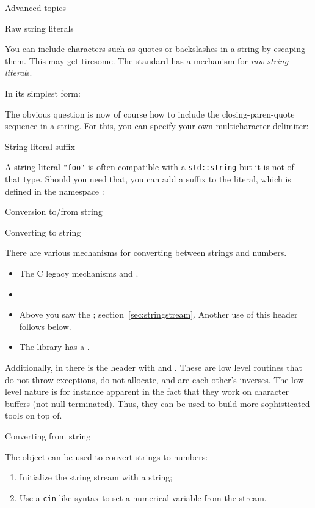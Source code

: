  {Advanced topics}

 {Raw string literals}

You can include characters such as quotes or backslashes in a string
by escaping them. This may get tiresome.
The  standard has a mechanism for 
\emph{raw string literal}s.

In its simplest form:

The obvious question is now of course how to include the
closing-paren-quote sequence in a string.
For this, you can specify your own multicharacter delimiter:

 {String literal suffix}

A string literal \lstinline+"foo"+ is often compatible with a
\lstinline+std::string+ but it is not of that type.
Should you need that, you can add a suffix to the literal,
which is defined in the namespace :
%

 {Conversion to/from string}

 {Converting to string}

There are various mechanisms for converting between strings and numbers.
\begin{itemize}
\item The C legacy mechanisms  and .
\item  {}
\item Above you saw the ; section~\ref{sec:stringstream}.
  Another use of this header follows below.
\item The  library has a .
\end{itemize}

Additionally, in  there is the
 header with  and
. These are low level routines that do not
throw exceptions, do not allocate, and are each other's inverses. The
low level nature is for instance apparent in the fact that they work
on character buffers (not null-terminated). Thus, they can be used to
build more sophisticated tools on top of.

 {Converting from string}

The  object can be used to convert strings to numbers:
\begin{enumerate}
\item Initialize the string stream with a string;
\item Use a \lstinline{cin}-like syntax to set a numerical variable from the stream.
\end{enumerate}

